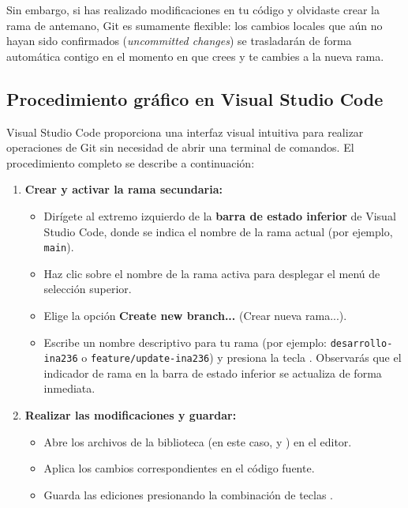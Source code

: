 \documentclass[
10pt, %
a4paper, %
oneside, %
headinclude,footinclude, %
BCOR5mm, %
]{scrartcl}
\begin{document}
Sin embargo, si has realizado modificaciones en tu código y olvidaste crear la rama de antemano, Git es sumamente flexible: los cambios locales que aún no hayan sido confirmados (\textit{uncommitted changes}) se trasladarán de forma automática contigo en el momento en que crees y te cambies a la nueva rama.

\subsection{Procedimiento gráfico en Visual Studio Code}
Visual Studio Code proporciona una interfaz visual intuitiva para realizar operaciones de Git sin necesidad de abrir una terminal de comandos. El procedimiento completo se describe a continuación:

\begin{enumerate}
	\item \textbf{Crear y activar la rama secundaria:}
	\begin{itemize}
		\item Dirígete al extremo izquierdo de la \textbf{barra de estado inferior} de Visual Studio Code, donde se indica el nombre de la rama actual (por ejemplo, \texttt{main}).
		\item Haz clic sobre el nombre de la rama activa para desplegar el menú de selección superior.
		\item Elige la opción \textbf{Create new branch...} (Crear nueva rama...).
		\item Escribe un nombre descriptivo para tu rama (por ejemplo: \texttt{desarrollo-ina236} o \texttt{feature/update-ina236}) y presiona la tecla . Observarás que el indicador de rama en la barra de estado inferior se actualiza de forma inmediata.
	\end{itemize}
	
	\item \textbf{Realizar las modificaciones y guardar:}
	\begin{itemize}
		\item Abre los archivos de la biblioteca (en este caso,  y ) en el editor.
		\item Aplica los cambios correspondientes en el código fuente.
		\item Guarda las ediciones presionando la combinación de teclas .
	\end{itemize}
	

\end{enumerate}
\end{document}
